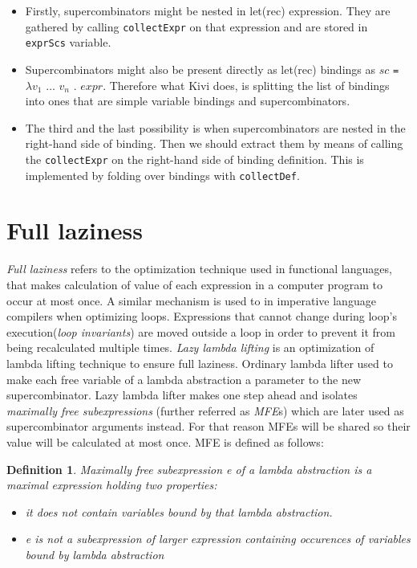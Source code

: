 \documentclass[12pt,a4paper]{report}
\newtheorem{definition}{Definition}[chapter]
\begin{document}
\begin{itemize}
  \item Firstly, supercombinators might be nested in let(rec)
    expression. They are gathered by calling \texttt{collectExpr} on that
    expression and are stored in \texttt{exprScs} variable.
  \item Supercombinators might also be present directly as let(rec)
    bindings as $sc$ \texttt{=} $\lambda v_1$ $\ldots$ $v_n$ . $expr$.
    Therefore what Kivi does, is splitting the list of bindings into ones that
    are simple variable bindings and supercombinators.
  \item The third and the last possibility is when supercombinators are nested
    in the right-hand side of binding. Then we should extract them by means of
    calling the \texttt{collectExpr} on the right-hand side of binding
    definition. This is implemented by folding over bindings with
    \texttt{collectDef}.
\end{itemize}

\section{Full laziness}
\textit{Full laziness} refers to the optimization technique used in functional
languages, that makes calculation of value of each expression in a computer
program to occur at most once. A similar mechanism is used to in imperative
language compilers when optimizing loops. Expressions that cannot change during
loop's execution(\textit{loop invariants}) are moved outside a loop in order to
prevent it from being recalculated multiple times.
\textit{Lazy lambda lifting} is an optimization of lambda lifting technique to
ensure full laziness. Ordinary lambda lifter used to make each free variable of
a lambda abstraction a parameter to the new supercombinator. Lazy lambda lifter
makes one step ahead and isolates \textit{maximally free subexpressions}
(further referred as \textit{MFE}s) which are later used as supercombinator
arguments instead. For that reason MFEs will be shared so their value will be
calculated at most once. MFE is defined as follows:

\begin{definition}
  Maximally free subexpression e of a lambda abstraction is a maximal
  expression holding two properties:

  \begin{itemize}
    \item it does not contain variables bound by that lambda abstraction.
    \item e is not a subexpression of larger expression containing occurences of
      variables bound by lambda abstraction
  \end{itemize}
\end{definition}
\end{document}
